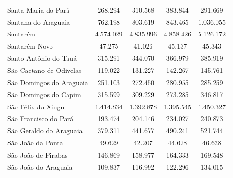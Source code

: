 \begin{table}[H]
{\begin{tabular}{l|c|c|c|c}
   Santa Maria do Pará      & 268.294     & 310.568    & 383.844   & 291.669         \\
   Santana do Araguaia      & 762.198     & 803.619    & 843.465   & 1.036.055       \\
   Santarém                 & 4.574.029   & 4.835.996  & 4.858.426 & 5.126.172       \\
   Santarém Novo            & 47.275      & 41.026     & 45.137    & 45.343          \\
   Santo Antônio do Tauá    & 315.291     & 344.070    & 366.979   & 385.919         \\
   São Caetano de Odivelas  & 119.022     & 131.227    & 142.267   & 145.761         \\
   São Domingos do Araguaia & 251.103     & 272.450    & 280.955   & 285.259         \\
   São Domingos do Capim    & 315.599     & 309.229    & 273.285   & 346.817         \\
   São Félix do Xingu       & 1.414.834   & 1.392.878  & 1.395.545 & 1.450.327       \\
   São Francisco do Pará    & 193.474     &  204.146   &  234.027  & 240.873         \\
   São Geraldo do Araguaia  & 379.311     &  441.677   & 490.241   & 521.744         \\
   São João da Ponta        & 39.629      & 42.207     & 44.628    & 46.628           \\
   São João de Pirabas      &  146.869    & 158.977    & 164.333   & 169.548          \\
   São João do Araguaia     & 109.837     & 116.992    &  122.296  & 134.015          \\
   \hline
\end{tabular}}
\end{table}


